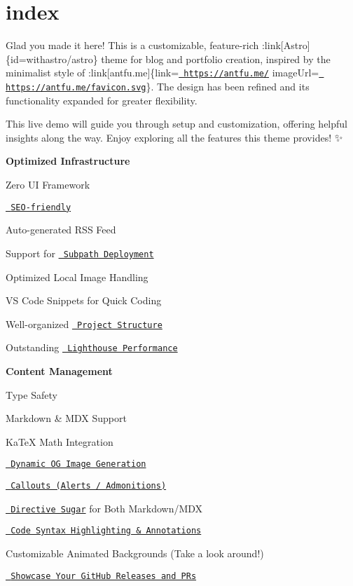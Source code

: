 \chapter{index}
\hypertarget{md_src_2content_2home_2index}{}\label{md_src_2content_2home_2index}
Glad you made it here! This is a customizable, feature-\/rich \+:link\mbox{[}Astro\mbox{]}\{id=withastro/astro\} theme for blog and portfolio creation, inspired by the minimalist style of \+:link\mbox{[}antfu.\+me\mbox{]}\{link=\href{https://antfu.me/}{\texttt{ https\+://antfu.\+me/}} image\+Url=\href{https://antfu.me/favicon.svg}{\texttt{ https\+://antfu.\+me/favicon.\+svg}}\}. The design has been refined and its functionality expanded for greater flexibility.

This live demo will guide you through setup and customization, offering helpful insights along the way. Enjoy exploring all the features this theme provides! ✨

{\bfseries{Optimized Infrastructure}}


\begin{DoxyItemize}
\item Zero UI Framework
\item \href{./blog/faqs-and-known-issues/\#about-seo-and-accessibility}{\texttt{ SEO-\/friendly}}
\item Auto-\/generated RSS Feed
\item Support for \href{./blog/basic-configuration/\#configuring-site}{\texttt{ Subpath Deployment}}
\item Optimized Local Image Handling
\item VS Code Snippets for Quick Coding
\item Well-\/organized \href{./blog/project-structure/}{\texttt{ Project Structure}}
\item Outstanding \href{./blog/faqs-and-known-issues/\#lighthouse-scores}{\texttt{ Lighthouse Performance}}
\end{DoxyItemize}

{\bfseries{Content Management}}


\begin{DoxyItemize}
\item Type Safety
\item Markdown \& MDX Support
\item Ka\+TeX Math Integration
\item \href{./blog/about-open-graph-images/}{\texttt{ Dynamic OG Image Generation}}
\item \href{./blog/markdown-mdx-extended-features/\#callouts-alerts--admonitions}{\texttt{ Callouts (Alerts / Admonitions)}}
\item \href{./blog/markdown-mdx-extended-features/\#image-caption--link}{\texttt{ Directive Sugar}} for Both Markdown/\+MDX
\item \href{./blog/markdown-mdx-extended-features/\#fully-featured-code-blocks}{\texttt{ Code Syntax Highlighting \& Annotations}}
\item Customizable Animated Backgrounds (Take a look around!)
\item \href{./blog/customizing-github-activity-pages}{\texttt{ Showcase Your Git\+Hub Releases and PRs}}
\end{DoxyItemize}

